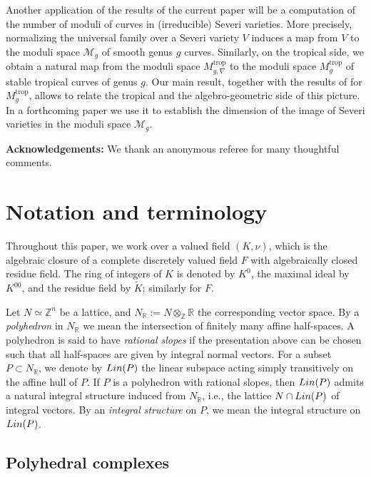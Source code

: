 \documentclass[11pt,reqno]{amsart}
\numberwithin{equation}{section}
\theoremstyle{definition}
\newcommand{\trop}{\mathrm{trop}}
\newcommand{\Lin}{{\rm Lin}}
\newcommand{\RR}{{\mathbb R}}
\newcommand{\ZZ}{{\mathbb Z}}
\newcommand{\CM}{{\mathcal M}}
\theoremstyle{remark}
\begin{document}
Another application of the results of the current paper will be a computation of the number of moduli of curves in (irreducible) Severi varieties. More precisely, normalizing the universal family over a Severi variety $V$ induces a map from $V$ to the moduli space $\CM_g$ of smooth genus $g$ curves. Similarly, on the tropical side, we obtain a natural map from the moduli space $M_{g,\nabla}^\trop$ to the moduli space $M_g^{\trop}$ of stable tropical curves of genus $g$. Our main result, together with the results of \cite{ACP15} for $M_g^{\trop}$, allows to relate the tropical and the algebro-geometric side of this picture. In a forthcoming paper \cite{CHT25} we use it to establish the dimension of the image of Severi varieties in the moduli space $\CM_g$.

\medskip

\textbf{Acknowledgements:} We thank an anonymous referee for many thoughtful comments.


\section{Notation and terminology}
Throughout this paper, we work over a valued field $(K, \nu)$, which is the algebraic closure of a complete discretely valued field $F$ with algebraically closed residue field. The ring of integers of $K$ is denoted by $K^0$, the maximal ideal by $K^{00}$, and the residue field by $\widetilde K$; similarly for $F$.

Let $N\simeq \ZZ^n$ be a lattice, and $N_\RR:=N\otimes_\ZZ\RR$ the corresponding vector space. By a {\em polyhedron} in $N_\RR$ we mean the intersection of finitely many affine half-spaces. A polyhedron is said to have {\em rational slopes} if the presentation above can be chosen such that all half-spaces are given by integral normal vectors. For a subset $P\subset N_\RR$, we denote by $\Lin(P)$ the linear subspace acting simply transitively on the affine hull of $P$. If $P$ is a polyhedron with rational slopes, then $\Lin(P)$ admits a natural integral structure induced from $N_\RR$, i.e., the lattice $N\cap \Lin(P)$ of integral vectors. By an {\em integral structure} on $P$, we mean the integral structure on $\Lin(P)$.

\subsection{Polyhedral complexes}
\end{document}

